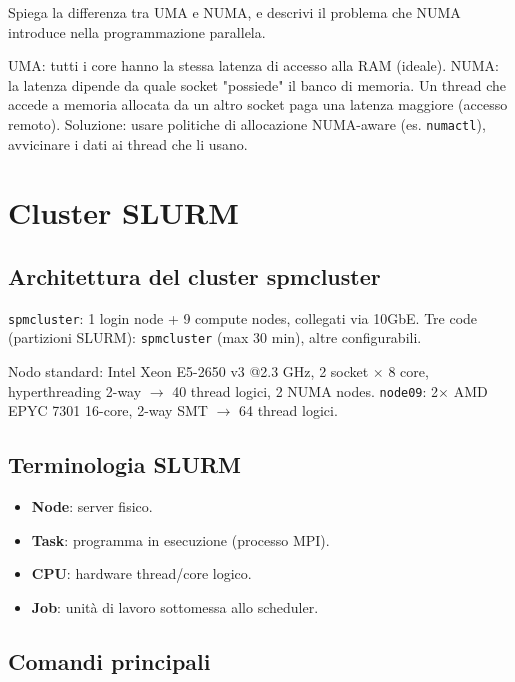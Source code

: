 \documentclass[11pt,a4paper]{article}
\theoremstyle{remark}
\newenvironment{esercizio}[1][]{%
  \begin{tcolorbox}[breakable,title={\textbf{Esercizio / Domanda d'esame}\ifx&#1&\else: #1\fi},
    colback=yellow!5!white, colframe=orange!75!black, fonttitle=\small\bfseries]%
}{%
  \end{tcolorbox}%
}
\newenvironment{risposta}{%
  \begin{tcolorbox}[breakable,title={\textbf{Risposta}},
    colback=green!5!white, colframe=green!50!black, fonttitle=\small\bfseries]%
}{%
  \end{tcolorbox}%
}
\begin{document}
\begin{esercizio}
Spiega la differenza tra UMA e NUMA, e descrivi il problema che NUMA introduce nella programmazione parallela.
\end{esercizio}
\begin{risposta}
UMA: tutti i core hanno la stessa latenza di accesso alla RAM (ideale). NUMA: la latenza dipende da quale socket "possiede" il banco di memoria. Un thread che accede a memoria allocata da un altro socket paga una latenza maggiore (accesso remoto). Soluzione: usare politiche di allocazione NUMA-aware (es. \texttt{numactl}), avvicinare i dati ai thread che li usano.
\end{risposta}

\section{Cluster SLURM}

\subsection{Architettura del cluster spmcluster}

\texttt{spmcluster}: 1 login node + 9 compute nodes, collegati via 10GbE. Tre code (partizioni SLURM): \texttt{spmcluster} (max 30 min), altre configurabili.

Nodo standard: Intel Xeon E5-2650 v3 @2.3 GHz, 2 socket $\times$ 8 core, hyperthreading 2-way $\to$ 40 thread logici, 2 NUMA nodes.
\texttt{node09}: 2$\times$ AMD EPYC 7301 16-core, 2-way SMT $\to$ 64 thread logici.

\subsection{Terminologia SLURM}

\begin{itemize}
  \item \textbf{Node}: server fisico.
  \item \textbf{Task}: programma in esecuzione (processo MPI).
  \item \textbf{CPU}: hardware thread/core logico.
  \item \textbf{Job}: unità di lavoro sottomessa allo scheduler.
\end{itemize}

\subsection{Comandi principali}
\end{document}
